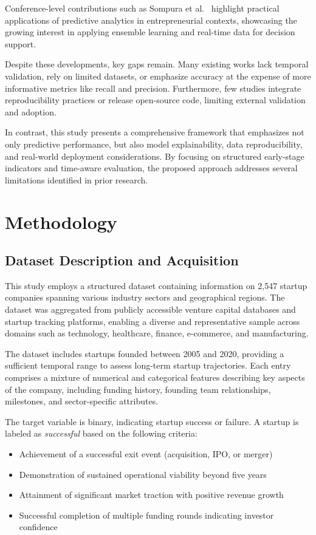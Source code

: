 \documentclass[conference]{IEEEtran}
\begin{document}
Conference-level contributions such as Sompura et al.~\cite{sompura2022predictive} highlight practical applications of predictive analytics in entrepreneurial contexts, showcasing the growing interest in applying ensemble learning and real-time data for decision support.

Despite these developments, key gaps remain. Many existing works lack temporal validation, rely on limited datasets, or emphasize accuracy at the expense of more informative metrics like recall and precision. Furthermore, few studies integrate reproducibility practices or release open-source code, limiting external validation and adoption.

In contrast, this study presents a comprehensive framework that emphasizes not only predictive performance, but also model explainability, data reproducibility, and real-world deployment considerations. By focusing on structured early-stage indicators and time-aware evaluation, the proposed approach addresses several limitations identified in prior research.

\section{Methodology}

\subsection{Dataset Description and Acquisition}

This study employs a structured dataset containing information on 2,547 startup companies spanning various industry sectors and geographical regions. The dataset was aggregated from publicly accessible venture capital databases and startup tracking platforms, enabling a diverse and representative sample across domains such as technology, healthcare, finance, e-commerce, and manufacturing.

The dataset includes startups founded between 2005 and 2020, providing a sufficient temporal range to assess long-term startup trajectories. Each entry comprises a mixture of numerical and categorical features describing key aspects of the company, including funding history, founding team relationships, milestones, and sector-specific attributes.

The target variable is binary, indicating startup success or failure. A startup is labeled as \textit{successful} based on the following criteria:
\begin{itemize}
    \item Achievement of a successful exit event (acquisition, IPO, or merger)
    \item Demonstration of sustained operational viability beyond five years
    \item Attainment of significant market traction with positive revenue growth
    \item Successful completion of multiple funding rounds indicating investor confidence
\end{itemize}
\end{document}
